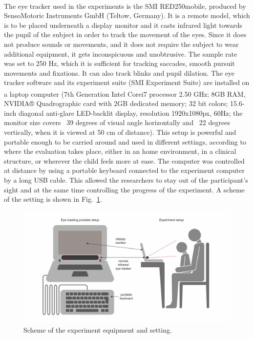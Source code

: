 The eye tracker used in the experiments is the SMI\textsuperscript{\textregistered} RED250mobile\texttrademark, produced by SensoMotoric Instruments GmbH (Teltow, Germany). It is a remote model, which is to be placed underneath a display monitor and it casts infrared light towards the pupil of the subject in order to track the movement of the eyes. Since it does not produce sounds or movements, and it does not require the subject to wear additional equipment, it gets inconspicuous and unobtrusive. The sample rate was set to 250 Hz, which it is sufficient for tracking saccades, smooth pursuit movements and fixations. It can also track blinks and pupil dilation. The eye tracker software and its experiment suite (SMI Experiment Suite) are installed on a laptop computer (7th Generation Intel\textsuperscript{\textregistered} Core\texttrademark i7 processor 2.50 GHz; 8GB RAM, NVIDIA® Quadro\texttrademark graphic card with 2GB dedicated memory; 32 bit colors; 15.6-inch diagonal anti-glare LED-backlit display, resolution 1920x1080px, 60Hz; the monitor size covers ~39 degrees of visual angle horizontally and ~22 degrees vertically, when it is viewed at 50 cm of distance). This setup is powerful and portable enough to be carried around and used in different settings, according to where the evaluation takes place, either in an home environment, in a clinical structure, or wherever the child feels more at ease.
The computer was controlled at distance by using a portable keyboard connected to the experiment computer by a long USB cable. This allowed the researchers to stay out of the participant’s sight and at the same time controlling the progress of the experiment. A scheme of the setting is shown in Fig.~\ref{fig:settingscheme}.

\begin{figure}[h]
  \centering
  \includegraphics[width=1\textwidth]{figures/setting-01.jpg}
  \caption[Experiment setting scheme]{Scheme of the experiment equipment and setting.}
  \label{fig:settingscheme}
\end{figure}

